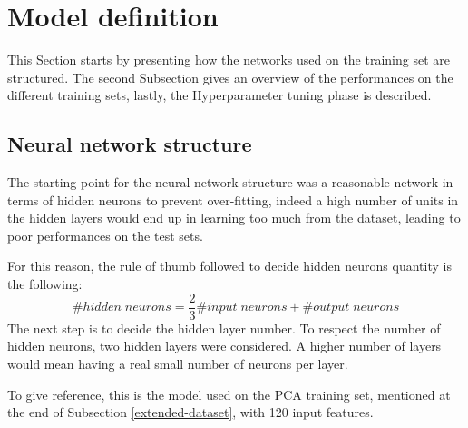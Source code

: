\section{Model definition}
\label{model-definition}
This Section starts by presenting how the networks used on the training set are 
structured. The second Subsection gives an overview of the performances 
on the different training sets, lastly, the Hyperparameter tuning phase
is described.

\subsection{Neural network structure}
The starting point for the neural network structure was a 
reasonable network in terms of hidden neurons to prevent over-fitting, 
indeed a high number of units in the hidden layers would end up in learning 
too much from the dataset, leading to poor performances on the test sets.

For this reason, the rule of thumb followed to decide hidden neurons quantity is the 
following: 
$$\#\mathit{hidden\; neurons} = \frac{2}{3}\#\mathit{input\;neurons}
+ \#\mathit{output\;neurons}$$
The next step is to decide the hidden layer number. To respect the 
number of hidden neurons, two hidden layers were considered. 
A higher number of layers would mean having a real small number of neurons per layer.

To give reference, this is the model used on the PCA training set, mentioned at 
the end of Subsection \vref{extended-dataset}, with 
120 input features.

